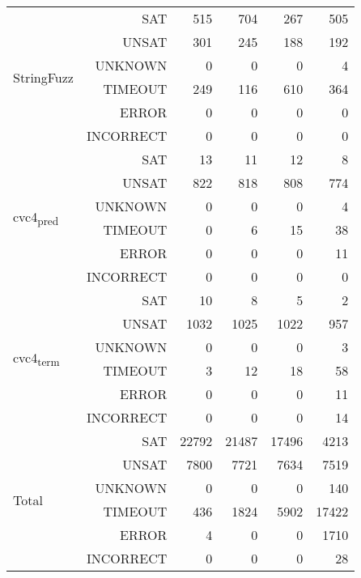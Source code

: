 \begin{table}[h]
{{\begin{tabular}{|l r | r r r r |}
\multirow{6}{*}{StringFuzz}	& SAT      &   515&   704&   267&   505 \\
							& UNSAT    &   301&   245&   188&   192 \\
							& UNKNOWN  &     0&     0&     0&     4 \\
							& TIMEOUT  &   249&   116&   610&   364 \\
							& ERROR    &     0&     0&     0&     0 \\
							& INCORRECT&     0&     0&     0&     0 \\\hline
\multirow{6}{*}{cvc4\textsubscript{pred}} & SAT &    13&    11&    12&     8 \\
							& UNSAT    &   822&   818&   808&   774 \\
							& UNKNOWN  &     0&     0&     0&     4 \\
							& TIMEOUT  &     0&     6&    15&    38 \\
							& ERROR    &     0&     0&     0&     11 \\
							& INCORRECT&     0&     0&     0&     0 \\ \hline
\multirow{6}{*}{cvc4\textsubscript{term}} & SAT &    10&     8&     5&    2 \\
							& UNSAT    &  1032&  1025&  1022&   957 \\
							& UNKNOWN  &     0&     0&     0&     3 \\
							& TIMEOUT  &     3&    12&    18&    58 \\
							& ERROR    &     0&     0&     0&     11 \\
							& INCORRECT&     0&     0&     0&    14 \\ \hline \hline
\multirow{6}{*}{Total} 		& SAT      & 22792& 21487& 17496&  4213\\
							& UNSAT    &  7800&  7721&  7634&  7519\\
							& UNKNOWN  &     0&     0&     0&   140\\
							& TIMEOUT  &  436&  1824&  5902& 17422 \\
							& ERROR    &     4&     0&     0&  1710\\
							& INCORRECT&     0&     0&     0&    28 \\\hline
\end{tabular}}
\label{table:base_benchmark}}
\end{table}

